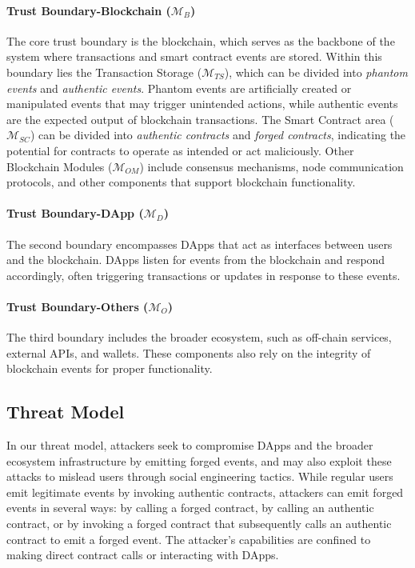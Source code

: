 \paragraph{Trust Boundary-Blockchain (\(\bm{\mathcal{M}}_B\))}
The core trust boundary is the blockchain, which serves as the backbone of the system where transactions and smart contract events are stored.
Within this boundary lies the Transaction Storage (\(\bm{\mathcal{M}}_{TS}\)), which can be divided into \emph{phantom events} and \emph{authentic events}.
Phantom events are artificially created or manipulated events that may trigger unintended actions, while authentic events are the expected output of blockchain transactions.
The Smart Contract area (\(\bm{\mathcal{M}}_{SC}\)) can be divided into \emph{authentic contracts} and \emph{forged contracts}, indicating the potential for contracts to operate as intended or act maliciously.
Other Blockchain Modules (\(\bm{\mathcal{M}}_{OM}\)) include consensus mechanisms, node communication protocols, and other components that support blockchain functionality.

\paragraph{Trust Boundary-DApp (\(\bm{\mathcal{M}}_{D}\))}
The second boundary encompasses DApps that act as interfaces between users and the blockchain.
DApps listen for events from the blockchain and respond accordingly, often triggering transactions or updates in response to these events.


\paragraph{Trust Boundary-Others (\(\bm{\mathcal{M}}_{O}\))}
The third boundary includes the broader ecosystem, such as off-chain services, external APIs, and wallets. These components also rely on the integrity of blockchain events for proper functionality.

\subsection{Threat Model}
In our threat model, attackers seek to compromise DApps and the broader ecosystem infrastructure by emitting forged events, and may also exploit these attacks to mislead users through social engineering tactics. While regular users emit legitimate events by invoking authentic contracts, attackers can emit forged events in several ways: by calling a forged contract, by calling an authentic contract, or by invoking a forged contract that subsequently calls an authentic contract to emit a forged event. The attacker's capabilities are confined to making direct contract calls or interacting with DApps.


